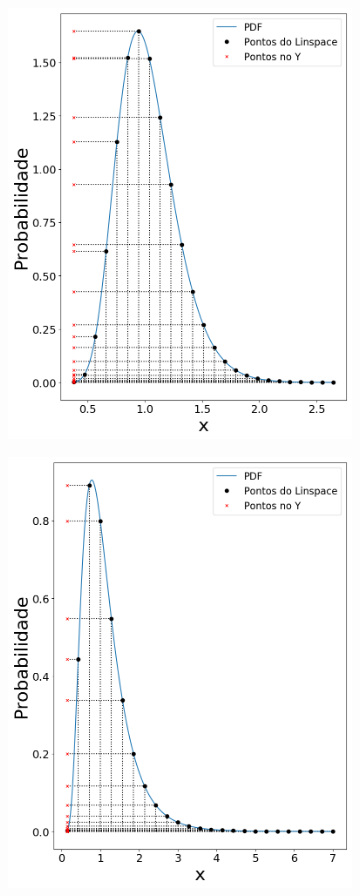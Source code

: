 \begin{figure}[H]
\begin{subfigure}[b]{0.3\textwidth}
		\includegraphics[width=\textwidth]{./figuras/lognormal_025}
		\caption{}
		\label{fig:lin025}
	\end{subfigure}
	\hfill
	\begin{subfigure}[b]{0.3\textwidth}
		\centering 
		\includegraphics[width=\textwidth]{./figuras/lognormal_05}

\end{subfigure}
\end{figure}
